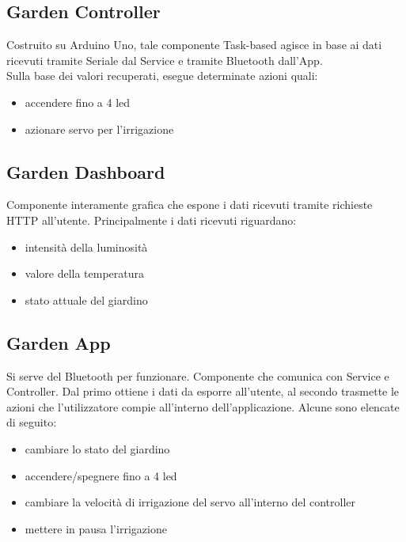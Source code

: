 \documentclass[a4paper, 12pt]{article}
\begin{document}
\subsection{Garden Controller}
Costruito su Arduino Uno, tale componente Task-based agisce in base ai dati ricevuti tramite Seriale dal Service e tramite Bluetooth dall'App.\\
Sulla base dei valori recuperati, esegue determinate azioni quali:
\begin{itemize}
    \item accendere fino a 4 led
    \item azionare servo per l'irrigazione
\end{itemize}

\subsection{Garden Dashboard}
Componente interamente grafica che espone i dati ricevuti tramite richieste HTTP all'utente. Principalmente i dati ricevuti riguardano:
\begin{itemize}
    \item intensità della luminosità
    \item valore della temperatura
    \item stato attuale del giardino
\end{itemize}

\subsection{Garden App}
Si serve del Bluetooth per funzionare. Componente che comunica con Service e Controller. Dal primo ottiene i dati da esporre all'utente, al secondo trasmette le azioni che l'utilizzatore compie all'interno dell'applicazione. Alcune sono elencate di seguito:
\begin{itemize}
    \item cambiare lo stato del giardino
    \item accendere/spegnere fino a 4 led
    \item cambiare la velocità di irrigazione del servo all'interno del controller
    \item mettere in pausa l'irrigazione
\end{itemize}
\clearpage
\end{document}
